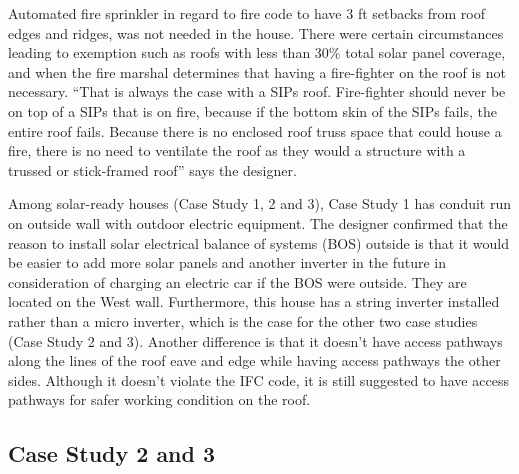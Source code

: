 \documentclass[]{article}
\begin{document}
Automated fire sprinkler in regard to fire code to have 3 ft setbacks
from roof edges and ridges, was not needed in the house. There were
certain circumstances leading to exemption such as roofs with less than
30\% total solar panel coverage, and when the fire marshal determines
that having a fire-fighter on the roof is not necessary. ``That is
always the case with a SIPs roof. Fire-fighter should never be on top of
a SIPs that is on fire, because if the bottom skin of the SIPs fails,
the entire roof fails. Because there is no enclosed roof truss space
that could house a fire, there is no need to ventilate the roof as they
would a structure with a trussed or stick-framed roof'' says the
designer.

Among solar-ready houses (Case Study 1, 2 and 3), Case Study 1 has
conduit run on outside wall with outdoor electric equipment. The
designer confirmed that the reason to install solar electrical balance
of systems (BOS) outside is that it would be easier to add more solar
panels and another inverter in the future in consideration of charging
an electric car if the BOS were outside. They are located on the West
wall. Furthermore, this house has a string inverter installed rather
than a micro inverter, which is the case for the other two case studies
(Case Study 2 and 3). Another difference is that it doesn't have access
pathways along the lines of the roof eave and edge while having access
pathways the other sides. Although it doesn't violate the IFC code, it
is still suggested to have access pathways for safer working condition
on the roof.

\hypertarget{case-study-2-and-3}{%
\subsection{Case Study 2 and 3}\label{case-study-2-and-3}}
\end{document}
